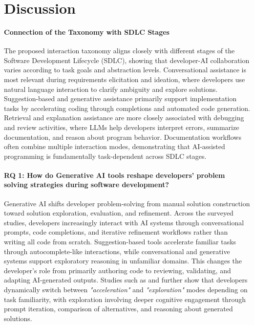 \section{Discussion}
\paragraph{Connection of the Taxonomy with SDLC Stages}
The proposed interaction taxonomy aligns closely with different stages of the Software Development Lifecycle (SDLC), showing that developer-AI collaboration varies according to task goals and abstraction levels. Conversational assistance is most relevant during requirements elicitation and ideation, where developers use natural language interaction to clarify ambiguity and explore solutions. Suggestion-based and generative assistance primarily support implementation tasks by accelerating coding through completions and automated code generation. Retrieval and explanation assistance are more closely associated with debugging and review activities, where LLMs help developers interpret errors, summarize documentation, and reason about program behavior. Documentation workflows often combine multiple interaction modes, demonstrating that AI-assisted programming is fundamentally task-dependent across SDLC stages.

\paragraph{RQ 1: How do Generative AI tools reshape developers' problem solving strategies during software development?}
Generative AI shifts developer problem-solving from manual solution construction toward solution exploration, evaluation, and refinement. Across the surveyed studies, developers increasingly interact with AI systems through conversational prompts, code completions, and iterative refinement workflows rather than writing all code from scratch. Suggestion-based tools accelerate familiar tasks through autocomplete-like interactions, while conversational and generative systems support exploratory reasoning in unfamiliar domains. This changes the developer's role from primarily authoring code to reviewing, validating, and adapting AI-generated outputs. Studies such as \citet{barke2022grounded} and \citet{bird2023copilot} further show that developers dynamically switch between \textit{"acceleration"} and \textit{"exploration"} modes depending on task familiarity, with exploration involving deeper cognitive engagement through prompt iteration, comparison of alternatives, and reasoning about generated solutions.

